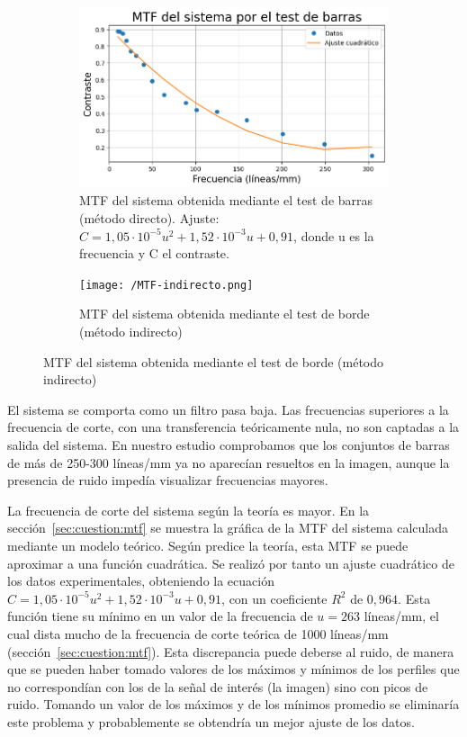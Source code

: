 \documentclass{./packages/optica-article}
\begin{document}
\begin{figure}
	\begin{subfigure}[t]{0.48\textwidth}
		\centering
		\includegraphics[width=\textwidth]{MTF-directo.png}
		\caption{MTF del sistema obtenida mediante el test de barras (método directo). Ajuste: $C = 1,05 \cdot 10^{-5} u^2 + 1,52 \cdot 10^{-3} u + 0,91$, donde u es la frecuencia y C el contraste.}
		\label{fig:mtf-directo}
	\end{subfigure}
	\quad
	\begin{subfigure}[t]{0.48\textwidth}
		\centering
		\texttt{[image: /MTF-indirecto.png]}
		\caption{MTF del sistema obtenida mediante el test de borde (método indirecto)}
		\label{fig:mtf-indirecto}
	\end{subfigure}
\end{figure}


El sistema se comporta como un filtro pasa baja. Las frecuencias superiores a la frecuencia de corte, con una transferencia teóricamente nula, no son captadas a la salida del sistema. En nuestro estudio comprobamos que los conjuntos de barras de más de 250-300 líneas/mm ya no aparecían resueltos en la imagen, aunque la presencia de ruido impedía visualizar frecuencias mayores.

La frecuencia de corte del sistema según la teoría es mayor. En la sección~\ref{sec:cuestion:mtf} se muestra la gráfica de la MTF del sistema calculada mediante un modelo teórico. Según predice la teoría, esta MTF se puede aproximar a una función cuadrática. Se realizó por tanto un ajuste cuadrático de los datos experimentales, obteniendo la ecuación $C = 1,05 \cdot 10^{-5} u^2 + 1,52 \cdot 10^{-3} u + 0,91$, con un coeficiente $R^2$ de $0,964$. Esta función tiene su mínimo en un valor de la frecuencia de $u = 263$ líneas/mm, el cual dista mucho de la frecuencia de corte teórica de 1000 líneas/mm (sección~\ref{sec:cuestion:mtf}). Esta discrepancia puede deberse al ruido, de manera que se pueden haber tomado valores de los máximos y mínimos de los perfiles que no correspondían con los de la señal de interés (la imagen) sino con picos de ruido. Tomando un valor de los máximos y de los mínimos promedio se eliminaría este problema y probablemente se obtendría un mejor ajuste de los datos.
\end{document}
